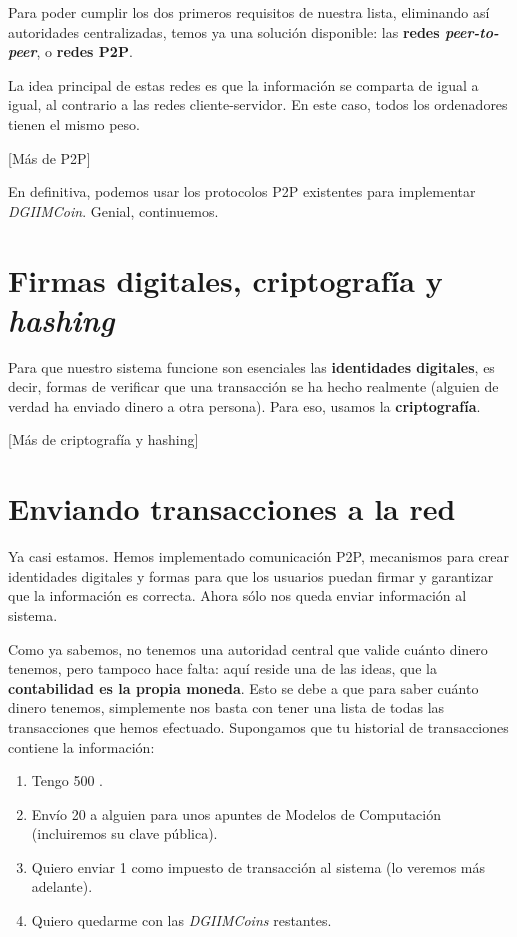 \documentclass[10pt, a4paper]{article}
\newcommand\dout{\bgroup \markoverwith{\rule[0.2ex]{0.1pt}{0.4pt}\rule[0.8ex]{0.1pt}{0.4pt}}\ULon}
\def\dout{\bgroup
 \markoverwith{\lower-0.35ex\hbox
 {\kern-.03em\vbox{\hrule width.2em\kern0.45ex\hrule}\kern-.03em}}%
 \ULon}
\theoremstyle{theorem-style}
\theoremstyle{theorem-style}
\theoremstyle{definition-style}
\theoremstyle{remark-style}
\theoremstyle{example-style}
\theoremstyle{definition-style}
\theoremstyle{remark-style}
\begin{document}
Para poder cumplir los dos primeros requisitos de nuestra lista,
eliminando así autoridades centralizadas, temos ya una solución
disponible: las \textbf{redes \emph{peer-to-peer}}, o \textbf{redes
P2P}.

La idea principal de estas redes es que la información se comparta de
igual a igual, al contrario a las redes cliente-servidor. En este caso,
todos los ordenadores tienen el mismo peso.

{[}Más de P2P{]}

En definitiva, podemos usar los protocolos P2P existentes para
implementar \emph{DGIIMCoin}. Genial, continuemos.

\section{Firmas digitales, criptografía y
\emph{hashing}}\label{firmas-digitales-criptografuxeda-y-hashing}

Para que nuestro sistema funcione son esenciales las \textbf{identidades
digitales}, es decir, formas de verificar que una transacción se ha
hecho realmente (alguien de verdad ha enviado dinero a otra persona).
Para eso, usamos la \textbf{criptografía}.

{[}Más de criptografía y hashing{]}

\section{Enviando transacciones a la
red}\label{enviando-transacciones-a-la-red}

Ya casi estamos. Hemos implementado comunicación P2P, mecanismos para
crear identidades digitales y formas para que los usuarios puedan firmar
y garantizar que la información es correcta. Ahora sólo nos queda enviar
información al sistema.

Como ya sabemos, no tenemos una autoridad central que valide cuánto
dinero tenemos, pero tampoco hace falta: aquí reside una de las ideas,
que la \textbf{contabilidad es la propia moneda}. Esto se debe a que
para saber cuánto dinero tenemos, simplemente nos basta con tener una
lista de todas las transacciones que hemos efectuado. Supongamos que tu
historial de transacciones contiene la información:

\begin{enumerate}
\def\labelenumi{\arabic{enumi}.}
\itemsep1pt\parskip0pt
\item
  Tengo 500 \dout{D}.
\item
  Envío 20 \dout{D} a alguien para unos apuntes de Modelos de
  Computación (incluiremos su clave pública).
\item
  Quiero enviar 1 \dout{D} como impuesto de transacción al sistema (lo
  veremos más adelante).
\item
  Quiero quedarme con las \emph{DGIIMCoins} restantes.
\end{enumerate}
\end{document}
